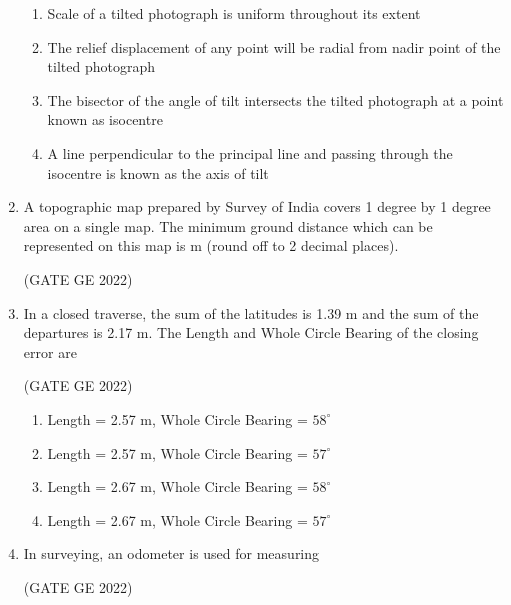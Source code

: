 \documentclass[journal,12pt,onecolumn]{IEEEtran}
\theoremstyle{remark}
\begin{document}
\begin{enumerate}
\begin{enumerate}
    \item Scale of a tilted photograph is uniform throughout its extent
    \item The relief displacement of any point will be radial from nadir point of the tilted photograph
    \item The bisector of the angle of tilt intersects the tilted photograph at a point known as isocentre
    \item A line perpendicular to the principal line and passing through the isocentre is known as the axis of tilt
\end{enumerate}

\item A topographic map prepared by Survey of India covers 1 degree by 1 degree area on a single map. The minimum ground distance which can be represented on this map is \makebox[1cm]{\hrulefill} m (round off to 2 decimal places).

\hfill (GATE GE 2022)

\item In a closed traverse, the sum of the latitudes is 1.39 m and the sum of the departures is 2.17 m. The Length and Whole Circle Bearing of the closing error are

\hfill (GATE GE 2022)

\begin{enumerate}
    \item Length = 2.57 m, Whole Circle Bearing = $58^\circ$
    \item Length = 2.57 m, Whole Circle Bearing = $57^\circ$
    \item Length = 2.67 m, Whole Circle Bearing = $58^\circ$
    \item Length = 2.67 m, Whole Circle Bearing = $57^\circ$
\end{enumerate}

\item In surveying, an odometer is used for measuring

\hfill (GATE GE 2022)

\begin{enumerate}
\end{enumerate}


\end{enumerate}
\end{document}
